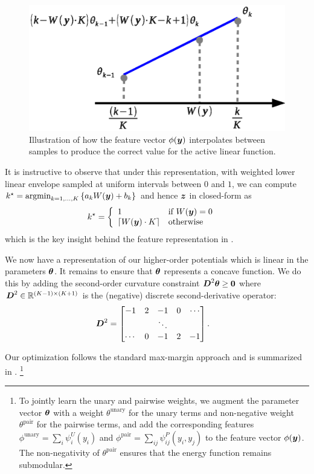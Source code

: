\documentclass[10pt,journal,letterpaper,compsoc]{IEEEtran}
\begin{document}
\begin{figure}[th]
  \centering
  \includegraphics[width=0.9\columnwidth]{figures/feature_interp}
  \caption{\label{fig:features} Illustration of how the feature vector
    $\phi({\boldsymbol{y}})$ interpolates between samples to produce the correct
    value for the active linear function.}
\end{figure}

It is instructive to observe that under this representation, with
weighted lower linear envelope sampled at uniform intervals between
$0$ and $1$, we can compute $k^\star = \mathop{\textrm{argmin}}_{k=1, \ldots, K} \left\{
a_k W({\boldsymbol{y}}) + b_k \right\}$ and hence ${\boldsymbol{z}}$ in closed-form as
%
\begin{align}
  k^\star &= \left\{ \begin{array}{ll}
    1 & \textrm{if $W({\boldsymbol{y}}) = 0$} \\
    \left\lceil W({\boldsymbol{y}}) \cdot K \right\rceil & \textrm{otherwise}
  \end{array} \right.
\end{align}
%
which is the key insight behind the feature representation in
.

We now have a representation of our higher-order potentials which is
linear in the parameters $\boldsymbol{\theta}$. It remains to ensure that
$\boldsymbol{\theta}$ represents a concave function. We do this by adding the
second-order curvature constraint ${\boldsymbol{D}}^2 \boldsymbol{\theta} \geq \textbf{0}$ where
${\boldsymbol{D}}^2 \in \mathbb{R}^{(K-1) \times (K+1)}$ is the (negative) discrete
second-derivative operator:
%
\begin{align}
  {\boldsymbol{D}}^2 &= \left[ \begin{matrix}
      -1 & 2 & -1 & 0 & \cdots \\
      & & \ddots \\
      \cdots & 0 & -1 & 2 & -1
    \end{matrix} \right].
\end{align}

Our optimization follows the standard max-margin approach and is
summarized in .%
%
\footnote{To jointly learn the unary and pairwise weights, we augment
  the parameter vector $\boldsymbol{\theta}$ with a weight $\theta^\textrm{unary}$
  for the unary terms and non-negative weight $\theta^\textrm{pair}$
  for the pairwise terms, and add the corresponding features
  $\phi^\textrm{unary} = \sum_i \psi^U_i\!(y_i)$ and $\phi^\textrm{pair} =
  \sum_{ij} \psi^P_{ij}(y_i, y_j)$ to the feature vector
  $\phi({\boldsymbol{y}})$. The non-negativity of $\theta^\textrm{pair}$ ensures
  that the energy function remains submodular.}
%
\end{document}
